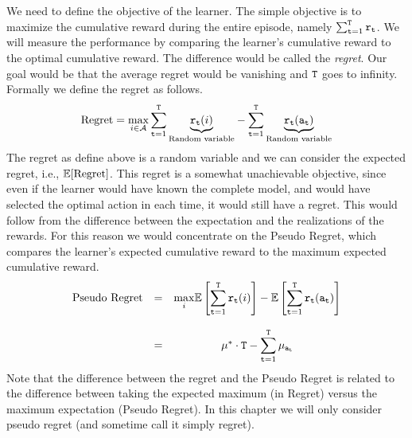 We need to define the objective of the learner. The simple objective is to maximize the cumulative reward during the entire episode, namely $\sum_{{\tt t}=1}^{\tt T} {\tt r}_{\tt t}$. We will measure the performance by comparing the learner's cumulative reward to the optimal cumulative reward. The difference would be called the \emph{regret}. Our goal would be that the average regret would be vanishing and ${\tt T}$ goes to infinity.
Formally we define the regret as follows.
\[
\text{Regret}=\max_{i\in \mathcal{A}}{\displaystyle
\sum_{{\tt t}=1}^{{\tt T}}\underbrace{{\tt r}_{{\tt t}}(i)}_{\text{Random variable}}}-{\displaystyle
\sum_{{\tt t}=1}^{{\tt T}}\underbrace{{\tt r}_{{\tt t}}({\tt a}_{{\tt t}})}_{\text{Random variable}}}
\]
The regret as define above is a random variable and we can consider the expected regret, i.e., $\mathbb{E}[\text{Regret}]$. This regret is a somewhat unachievable objective, since even if the learner would have known the complete model, and would have selected the optimal action in each time, it would still have a regret. This would follow from the difference between the expectation and the realizations of the rewards.
For this reason we would concentrate on the Pseudo Regret, which compares the learner's expected cumulative reward to the maximum expected cumulative reward. 
\[
\begin{array}{ccc}
\text{Pseudo Regret} & = & {\displaystyle \max_{i}}\mathbb{E}\left[{\displaystyle \sum_{{\tt t}=1}^{{\tt T}}{\tt r}_{{\tt t}}(i)}\right]-\mathbb{E}\left[{\displaystyle \sum_{{\tt t}=1}^{{\tt T}}{\tt r}_{{\tt t}}({\tt a}_{{\tt t}})}\right]\\
\\
 & = & \mu^{*}\cdot {\tt T}-{\displaystyle \sum_{{\tt t}=1}^{{\tt T}}\mu_{{\tt a}_{{\tt t}}}}
\end{array}
\]
Note that the difference between the regret and the Pseudo Regret is related to the difference between taking the expected maximum (in Regret) versus the maximum expectation (Pseudo Regret). In this chapter we will only consider pseudo regret (and sometime call it simply regret). 




